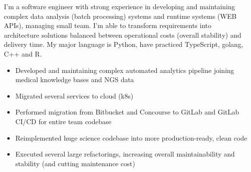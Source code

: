 \documentclass[9pt]{developercv} %
\begin{document}
\vspace{0.3cm} %


\begin{minipage}[t]{0.4\textwidth} %
	\vspace{-\baselineskip} %

	I'm a software engineer with strong experience in developing and maintaining complex data analysis (batch processing) systems and runtime systems (WEB APIs), managing small team. I'm able to transform requirements into architecture solutions balanced between operational costs (overall stability) and delivery time. My major language is Python, have practiced TypeScript, golang, C++ and R.
\end{minipage}
\hfill %
\begin{minipage}[t]{0.5\textwidth} %
	\vspace{-\baselineskip} %
	\begin{itemize}
		\item{Developed and maintaining complex automated analytics pipeline joining medical knowledge bases and NGS data}
		\item{Migrated several services to cloud (k8s)}
		\item{Performed migration from Bitbucket and Concourse to GitLab and GitLab CI/CD for entire team codebase}
		\item{Reimplemented huge science codebase into more production-ready, clean code}
		\item{Executed several large refactorings, increasing overall maintainability and stability (and cutting maintenance cost)}
	\end{itemize}
\end{minipage}
\end{document}

